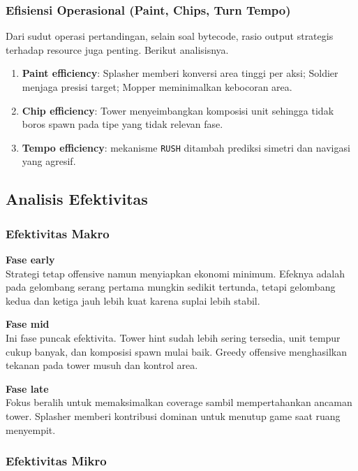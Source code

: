 \subsubsection{Efisiensi Operasional (Paint, Chips, Turn Tempo)}

Dari sudut operasi pertandingan, selain soal bytecode, rasio output strategis terhadap resource juga penting. Berikut analisisnya.

\begin{enumerate}
    \item \textbf{Paint efficiency}: Splasher memberi konversi area tinggi per aksi; Soldier menjaga presisi target; Mopper meminimalkan kebocoran area.
    \item \textbf{Chip efficiency}: Tower menyeimbangkan komposisi unit sehingga tidak boros spawn pada tipe yang tidak relevan fase.
    \item \textbf{Tempo efficiency}: mekanisme \texttt{RUSH} ditambah prediksi simetri dan navigasi yang agresif.
\end{enumerate}

\subsection{Analisis Efektivitas}

\subsubsection{Efektivitas Makro}

\textbf{Fase early}\\
Strategi tetap offensive namun menyiapkan ekonomi minimum. Efeknya adalah pada gelombang serang pertama mungkin sedikit tertunda, tetapi gelombang kedua dan ketiga jauh lebih kuat karena suplai lebih stabil.

\textbf{Fase mid}\\
Ini fase puncak efektivita. Tower hint sudah lebih sering tersedia, unit tempur cukup banyak, dan komposisi spawn mulai baik. Greedy offensive menghasilkan tekanan pada tower musuh dan kontrol area.

\textbf{Fase late}\\
Fokus beralih untuk memaksimalkan coverage sambil mempertahankan ancaman tower. Splasher memberi kontribusi dominan untuk menutup game saat ruang menyempit.

\subsubsection{Efektivitas Mikro}

